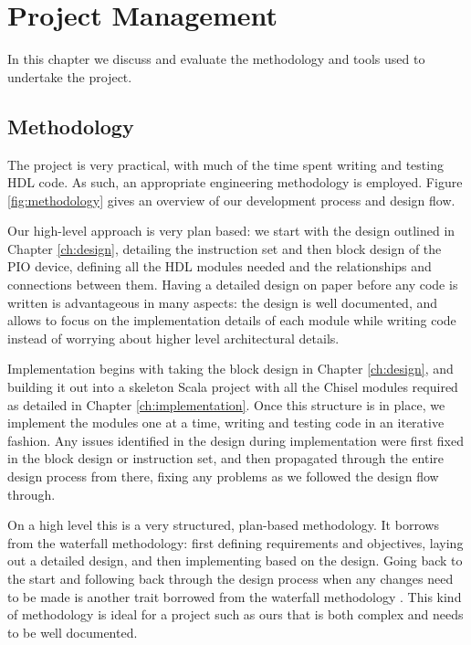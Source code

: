 \chapter{Project Management}
\label{ch:projman}

In this chapter we discuss and evaluate the methodology and tools used to undertake the project.

\section{Methodology}
The project is very practical, with much of the time spent writing and testing HDL code. As such, an appropriate engineering methodology is employed. Figure \ref{fig:methodology} gives an overview of our development process and design flow.

Our high-level approach is very plan based: we start with the design outlined in Chapter \ref{ch:design}, detailing the instruction set and then block design of the PIO device, defining all the HDL modules needed and the relationships and connections between them. Having a detailed design on paper before any code is written is advantageous in many aspects: the design is well documented, and allows to focus on the implementation details of each module while writing code instead of worrying about higher level architectural details.

Implementation begins with taking the block design in Chapter \ref{ch:design}, and building it out into a skeleton Scala project with all the Chisel modules required as detailed in Chapter \ref{ch:implementation}. Once this structure is in place, we implement the modules one at a time, writing and testing code in an iterative fashion. Any issues identified in the design during implementation were first fixed in the block design or instruction set, and then propagated through the entire design process from there, fixing any problems as we followed the design flow through.

On a high level this is a very structured, plan-based methodology. It borrows from the waterfall methodology: first defining requirements and objectives, laying out a detailed design, and then implementing based on the design. Going back to the start and following back through the design process when any changes need to be made is another trait borrowed from the waterfall methodology \cite{softeng}. This kind of methodology is ideal for a project such as ours that is both complex and needs to be well documented.

